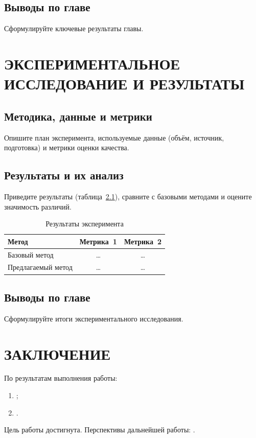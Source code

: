 \documentclass[12pt,a4paper]{extreport}
\begin{document}
\section{Выводы по главе}
Сформулируйте ключевые результаты главы.

\clearpage
\chapter{ЭКСПЕРИМЕНТАЛЬНОЕ ИССЛЕДОВАНИЕ И РЕЗУЛЬТАТЫ}
\section{Методика, данные и метрики}
Опишите план эксперимента, используемые данные (объём, источник, подготовка)
и метрики оценки качества.

\section{Результаты и их анализ}
Приведите результаты (таблица~\ref{tab:results}), сравните с базовыми методами
и оцените значимость различий.

\begin{table}[H]
\caption{Результаты эксперимента}
\label{tab:results}
\centering
\begin{tabular}{|>{\raggedright\arraybackslash}p{5cm}|c|c|}
\hline
\textbf{Метод} & \textbf{Метрика~1} & \textbf{Метрика~2} \\
\hline
Базовый метод      & \ldots & \ldots \\
\hline
Предлагаемый метод & \ldots & \ldots \\
\hline
\end{tabular}
\end{table}

\section{Выводы по главе}
Сформулируйте итоги экспериментального исследования.

\clearpage
\chapter*{ЗАКЛЮЧЕНИЕ}
По результатам выполнения работы:
\begin{enumerate}[label=\arabic*), leftmargin=1.25cm]
  \item {};
  \item {}.
\end{enumerate}
Цель работы достигнута. Перспективы дальнейшей работы: .
\end{document}
